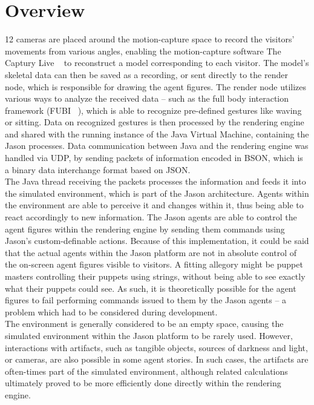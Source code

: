 \documentclass[draft,final]{vutinfth} %
\begin{document}
\section{Overview}
\label{chap:overview}

12 cameras are placed around the motion-capture space to record the visitors’ movements from various angles, enabling the motion-capture software The Captury Live ~\cite{capturyLive} to reconstruct a model corresponding to each visitor. 
The model’s skeletal data can then be saved as a recording, or sent directly to the render node, which is responsible for drawing the agent figures. 
The render node utilizes various ways to analyze the received data – such as the full body interaction framework (FUBI ~\cite{fubi}), which is able to recognize pre-defined gestures like waving or sitting. 
Data on recognized gestures is then processed by the rendering engine and shared with the running instance of the Java Virtual Machine, containing the Jason processes. 
Data communication between Java and the rendering engine was handled via UDP, by sending packets of information encoded in BSON, which is a binary data interchange format based on JSON. \\
The Java thread receiving the packets processes the information and feeds it into the simulated environment, which is part of the Jason architecture. 
Agents within the environment are able to perceive it and changes within it, thus being able to react accordingly to new information. 
The Jason agents are able to control the agent figures within the rendering engine by sending them commands using Jason’s custom-definable actions. 
Because of this implementation, it could be said that the actual agents within the Jason platform are not in absolute control of the on-screen agent figures visible to visitors. 
A fitting allegory might be puppet masters controlling their puppets using strings, without being able to see exactly what their puppets could see. 
As such, it is theoretically possible for the agent figures to fail performing commands issued to them by the Jason agents – a problem which had to be considered during development. \\
The environment is generally considered to be an empty space, causing the simulated environment within the Jason platform to be rarely used. 
However, interactions with artifacts, such as tangible objects, sources of darkness and light, or cameras, are also possible in some agent stories. 
In such cases, the artifacts are often-times part of the simulated environment, although related calculations ultimately proved to be more efficiently done directly within the rendering engine. \\
\end{document}

